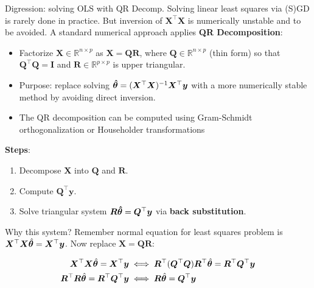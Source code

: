 \documentclass[11pt,compress,t,notes=noshow, xcolor=table]{beamer}
\begin{document}
\begin{vbframe}{Digression: solving OLS with QR Decomp.}
Solving linear least squares via (S)GD is rarely done in practice. But inversion of $\bm{X}^{\top}\bm{X}$ is numerically unstable and to be avoided. A standard numerical approach applies \textbf{QR Decomposition}:
\medskip
\begin{itemize}
    \item Factorize \( \bm{X} \in \mathbb{R}^{n \times p} \) as \( \bm{X} = \bm{Q}\bm{R} \), where \( \bm{Q} \in \mathbb{R}^{n \times p} \) (thin form) so that $\bm{Q}^{\top}\bm{Q}=\bm{I}$ and \( \bm{R} \in \mathbb{R}^{p \times p} \) is upper triangular.
    \item Purpose: replace solving \( \bm{\hat{\theta}} = (\bm{X}^{\top} \bm{X})^{-1} \bm{X}^{\top} \bm{y} \) with a more numerically stable method by avoiding direct inversion.
    \item The QR decomposition can be computed using Gram-Schmidt orthogonalization or Householder transformations
\end{itemize}

\textbf{Steps}:
\begin{enumerate}
    \item Decompose \( \bm{X} \) into \( \bm{Q} \) and \( \bm{R} \).
    \item Compute \( \bm{Q}^{\top} \bm{y} \).
    \item Solve triangular system \( \bm{R} \bm{\hat{\theta}} = \bm{Q}^{\top} \bm{y} \) via \textbf{back substitution}.
\end{enumerate}

Why this system? Remember normal equation for least squares problem is $\bm{X}^{\top}\bm{X} \hat{\bm{\theta}} = \bm{X}^{\top}\bm{y}$. Now replace $\bm{X}=\bm{Q} \bm{R}$:

\begin{align*}
    \bm{X}^{\top}\bm{X} \hat{\bm{\theta}} = \bm{X}^{\top}\bm{y} &\iff \bm{R}^{\top}(\bm{Q}^{\top} \bm{Q}) \bm{R}^{\top} \hat{\bm{\theta}} = \bm{R}^{\top} \bm{Q}^{\top} \bm{y} \\
    \bm{R}^{\top}\bm{R} \hat{\bm{\theta}} = \bm{R}^{\top} \bm{Q}^{\top} \bm{y} & \iff \bm{R} \hat{\bm{\theta}} = \bm{Q}^{\top} \bm{y}\\
\end{align*}


\end{vbframe}
\end{document}

